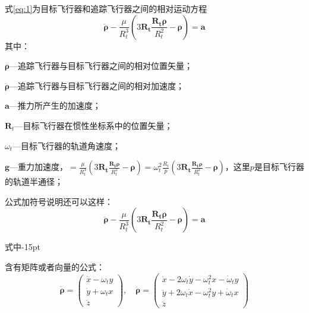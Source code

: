 式\eqref{eq:1}为目标飞行器和追踪飞行器之间的相对运动方程
\begin{equation}\label{eq:1}
\ddot{\boldsymbol{\rho}}-\frac{\mu}{R_{t}^{3}}\left( 3\mathbf{R_{t}}\frac{\mathbf{R_{t}\rho}}{R_{t}^{2}}-\boldsymbol{\rho}\right)=\mathbf{a}
\end{equation}
其中：

$\boldsymbol{\rho}$---追踪飞行器与目标飞行器之间的相对位置矢量；

$\ddot{\boldsymbol{\rho}}$---追踪飞行器与目标飞行器之间的相对加速度；

$\mathbf{a}$---推力所产生的加速度；

$\mathbf{R}_{t}$---目标飞行器在惯性坐标系中的位置矢量；

$\omega_{t}$---目标飞行器的轨道角速度；

$\mathbf{g}$---重力加速度，$=\frac{\mu}{R_{t}^{3}}\left(
3\mathbf{R_{t}}\frac{\mathbf{R_{t}\rho}}{R_{t}^{2}}-\boldsymbol{\rho}\right)=\omega_{t}^{2}\frac{R_{t}}{p}\left(
3\mathbf{R_{t}}\frac{\mathbf{R_{t}\rho}}{R_{t}^{2}}-\boldsymbol{\rho}\right)$，这里$p$是目标飞行器的轨道半通径；

公式加符号说明还可以这样：
\begin{equation}\label{eq:111}
\ddot{\boldsymbol{\rho}}-\frac{\mu}{R_{t}^{3}}\left( 3\mathbf{R_{t}}\frac{\mathbf{R_{t}\rho}}{R_{t}^{2}}-\boldsymbol{\rho}\right)=\mathbf{a}
\end{equation}
\begin{formulasymb}{式中}{-15pt}%
\end{formulasymb}

含有矩阵或者向量的公式：
\begin{equation}\label{eq:rho}
\dot{\boldsymbol{\rho}}=\left( \begin{array}{c}
\dot{x}-\omega_{t}y\\\dot{y}+\omega_{t}x\\\dot{z}
\end{array}\right) , \quad
\ddot{\boldsymbol{\rho}}=\left( \begin{array}{c}
\ddot{x}-2\omega_{t}\dot{y}-\omega_{t}^{2}x-\dot{\omega}_{t}y\\
\ddot{y}+2\omega_{t}\dot{x}-\omega_{t}^{2}y+\dot{\omega}_{t}x\\
\ddot{z}
\end{array}\right)
\end{equation}

